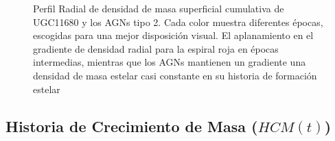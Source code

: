 \begin{figure}[htbp]
\centering
{}
\caption[Perfil radial de masa estelar cumulativa de UGC11680 y AGNs]{Perfil Radial de densidad de masa superficial cumulativa de UGC11680 y los AGNs tipo 2. Cada color muestra diferentes épocas, escogidas para una mejor disposición visual. El aplanamiento en el gradiente de densidad radial para la espiral roja en épocas intermedias, mientras que los AGNs mantienen un gradiente una densidad de masa estelar casi constante en su historia de formación estelar}
\label{perfil_radial}
\end{figure}



\subsection{Historia de Crecimiento de Masa ($HCM(t)$)}

